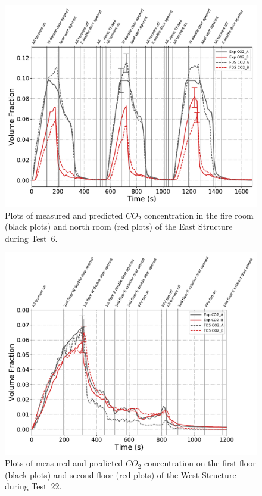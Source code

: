 \begin{figure}[!h]
	\centering
	\includegraphics[width=\columnwidth]{Figures/Plots/Validation/Gas_Concentration/Test_6_CO2}
	\caption[Plots of measured and predicted $CO_2$ concentration during Test~6.]{Plots of measured and predicted $CO_2$ concentration in the fire room (black plots) and north room (red plots) of the East Structure during Test~6.}
	\label{fig:Test6_CO2}
\end{figure}

\begin{figure}[!h]
	\centering
	\includegraphics[width=\columnwidth]{Figures/Plots/Validation/Gas_Concentration/Test_22_CO2}
	\caption[Plots of measured and predicted $CO_2$ concentration during Test~22.]{Plots of measured and predicted $CO_2$ concentration on the first floor (black plots) and second floor (red plots) of the West Structure during Test~22.}
	\label{fig:Test22_CO2}
\end{figure}

